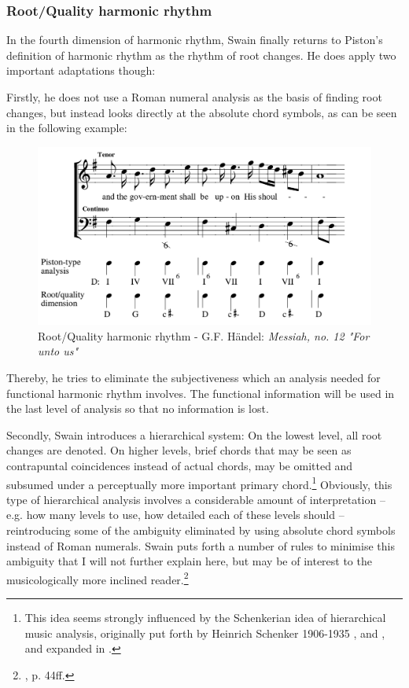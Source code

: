 \documentclass[a4paper,12pt]{report}
\begin{document}
\subsubsection{Root/Quality harmonic rhythm}
In the fourth dimension of harmonic rhythm, Swain finally returns to Piston's definition of harmonic rhythm as the rhythm of root changes. He does apply two important adaptations though:

Firstly, he does not use a Roman numeral analysis as the basis of finding root changes, but instead looks directly at the absolute chord symbols, as can be seen in the following example:

\begin{figure}[h]
\centering
\includegraphics[scale=0.35]{Haendel_Messias_Tenor.jpg}
\caption{Root/Quality harmonic rhythm - G.F. Händel: \textit{Messiah, no. 12 "For unto us"}}
\end{figure}

Thereby, he tries to eliminate the subjectiveness which an analysis needed for functional harmonic rhythm involves. The functional information will be used in the last level of analysis so that no information is lost.

Secondly, Swain introduces a hierarchical system: On the lowest level, all root changes are denoted. On higher levels, brief chords that may be seen as contrapuntal coincidences instead of actual chords, may be omitted and subsumed under a perceptually more important primary chord.\footnote{This idea seems strongly influenced by the Schenkerian idea of hierarchical music analysis, originally put forth by Heinrich Schenker 1906-1935 \cite{schenker1906harmonielehre}, \cite{schenker1991neue} and \cite{schenker1956freie}, and expanded in \cite{jackendoff1983generative}.} Obviously, this type of hierarchical analysis involves a considerable amount of interpretation -- e.g. how many levels to use, how detailed each of these levels should -- reintroducing some of the ambiguity eliminated by using absolute chord symbols instead of Roman numerals. Swain puts forth a number of rules to minimise this ambiguity that I will not further explain here, but may be of interest to the musicologically more inclined reader.\footnote{\cite{swain2002harmonic}, p. 44ff.}
\end{document}
